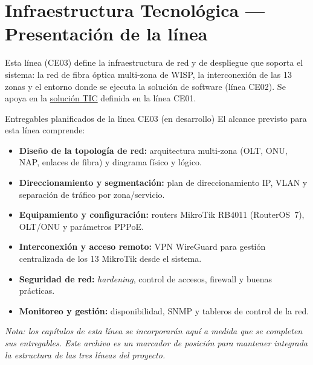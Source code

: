 \chapter{Infraestructura Tecnológica — Presentación de la línea}
\label{chap:ce03-intro}

Esta línea (CE03) define la infraestructura de red y de despliegue que soporta el
sistema: la red de fibra óptica multi-zona de WISP, la interconexión de las 13 zonas
y el entorno donde se ejecuta la solución de software (línea CE02). Se apoya en la
\hyperref[chap:soluciontic]{solución TIC} definida en la línea CE01.

\begin{upeubox}{Entregables planificados de la línea CE03 (en desarrollo)}
El alcance previsto para esta línea comprende:
\begin{itemize}[leftmargin=1.4em]
  \item \textbf{Diseño de la topología de red:} arquitectura multi-zona (OLT, ONU,
  NAP, enlaces de fibra) y diagrama físico y lógico.
  \item \textbf{Direccionamiento y segmentación:} plan de direccionamiento IP, VLAN
  y separación de tráfico por zona/servicio.
  \item \textbf{Equipamiento y configuración:} routers MikroTik RB4011 (RouterOS~7),
  OLT/ONU y parámetros PPPoE.
  \item \textbf{Interconexión y acceso remoto:} VPN WireGuard para gestión
  centralizada de los 13 MikroTik desde el sistema.
  \item \textbf{Seguridad de red:} \textit{hardening}, control de accesos, firewall y
  buenas prácticas.
  \item \textbf{Monitoreo y gestión:} disponibilidad, SNMP y tableros de control de la
  red.
\end{itemize}
\end{upeubox}

\medskip
\textit{Nota: los capítulos de esta línea se incorporarán aquí a medida que se
completen sus entregables. Este archivo es un marcador de posición para mantener
integrada la estructura de las tres líneas del proyecto.}

%   
%   
%   
%   
%   
%   

